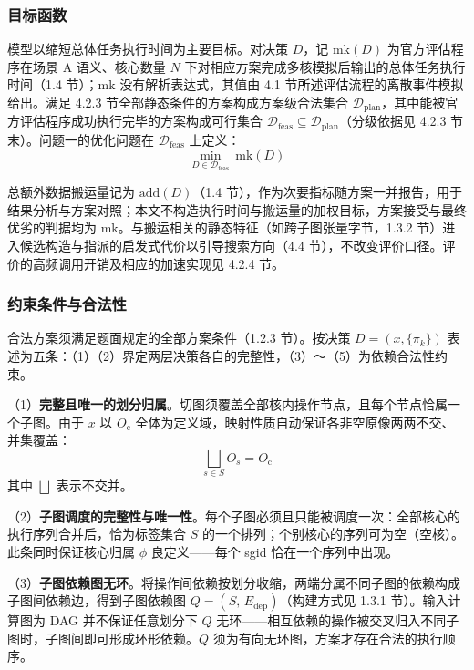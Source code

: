 \subsubsection{目标函数}
模型以缩短总体任务执行时间为主要目标。对决策 $D$，记 $\mathrm{mk}(D)$ 为官方评估程序在场景 A 语义、核心数量 $N$ 下对相应方案完成多核模拟后输出的总体任务执行时间（1.4 节）；$\mathrm{mk}$ 没有解析表达式，其值由 4.1 节所述评估流程的离散事件模拟给出。满足 4.2.3 节全部静态条件的方案构成方案级合法集合 $\mathcal{D}_{\mathrm{plan}}$，其中能被官方评估程序成功执行完毕的方案构成可行集合 $\mathcal{D}_{\mathrm{feas}}\subseteq\mathcal{D}_{\mathrm{plan}}$（分级依据见 4.2.3 节末）。问题一的优化问题在 $\mathcal{D}_{\mathrm{feas}}$ 上定义：
\begin{equation}\label{eq:q1-object}
\min_{D\in\mathcal{D}_{\mathrm{feas}}}\ \mathrm{mk}(D)
\end{equation}

总额外数据搬运量记为 $\mathrm{add}(D)$（1.4 节），作为次要指标随方案一并报告，用于结果分析与方案对照；本文不构造执行时间与搬运量的加权目标，方案接受与最终优劣的判据均为 $\mathrm{mk}$。与搬运相关的静态特征（如跨子图张量字节，1.3.2 节）进入候选构造与指派的启发式代价以引导搜索方向（4.4 节），不改变评价口径。评价的高频调用开销及相应的加速实现见 4.2.4 节。

\subsubsection{约束条件与合法性}\label{sec:validation}
合法方案须满足题面规定的全部方案条件（1.2.3 节）。按决策 $D=(x,\{\pi_k\})$ 表述为五条：（1）（2）界定两层决策各自的完整性，（3）～（5）为依赖合法性约束。

（1）\textbf{完整且唯一的划分归属}。切图须覆盖全部核内操作节点，且每个节点恰属一个子图。由于 $x$ 以 $O_{\mathrm{c}}$ 全体为定义域，映射性质自动保证各非空原像两两不交、并集覆盖：
\begin{equation}
\bigsqcup_{s\in S} O_s = O_{\mathrm{c}}
\end{equation}
其中 $\bigsqcup$ 表示不交并。

（2）\textbf{子图调度的完整性与唯一性}。每个子图必须且只能被调度一次：全部核心的执行序列合并后，恰为标签集合 $S$ 的一个排列；个别核心的序列可为空（空核）。此条同时保证核心归属 $\phi$ 良定义——每个 sgid 恰在一个序列中出现。

（3）\textbf{子图依赖图无环}。将操作间依赖按划分收缩，两端分属不同子图的依赖构成子图间依赖边，得到子图依赖图 $Q=(S,\,E_{\mathrm{dep}})$（构建方式见 1.3.1 节）。输入计算图为 DAG 并不保证任意划分下 $Q$ 无环——相互依赖的操作被交叉归入不同子图时，子图间即可形成环形依赖。$Q$ 须为有向无环图，方案才存在合法的执行顺序。

